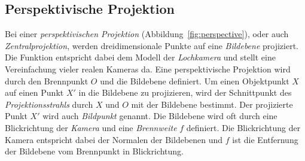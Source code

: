 \documentclass[ngerman,a4paper,parskip=half]{scrartcl}
\begin{document}
\subsection{Perspektivische Projektion}
\label{sec:perspective}

Bei einer \emph{perspektivischen Projektion} (Abbildung~\ref{fig:perspective}), oder auch \emph{Zentralprojektion}, werden dreidimensionale Punkte auf eine \emph{Bildebene} projiziert. Die Funktion entspricht dabei dem Modell der \emph{Lochkamera} und stellt eine Vereinfachung vieler realen Kameras da. Eine perspektivische Projektion wird durch den Brennpunkt $O$ und die Bildebene definiert. Um einen Objektpunkt $X$ auf einen Punkt $X'$ in die Bildebene zu projizieren, wird der Schnittpunkt des \emph{Projektionsstrahls} durch $X$ und $O$ mit der Bildebene bestimmt. Der projizierte Punkt $X'$ wird auch \emph{Bildpunkt} genannt. Die Bildebene wird oft durch eine Blickrichtung der \emph{Kamera} und eine \emph{Brennweite} $f$ definiert. Die Blickrichtung der Kamera entspricht dabei der Normalen der Bildebenen und $f$ ist die Entfernung der Bildebene vom Brennpunkt in Blickrichtung.
\end{document}
